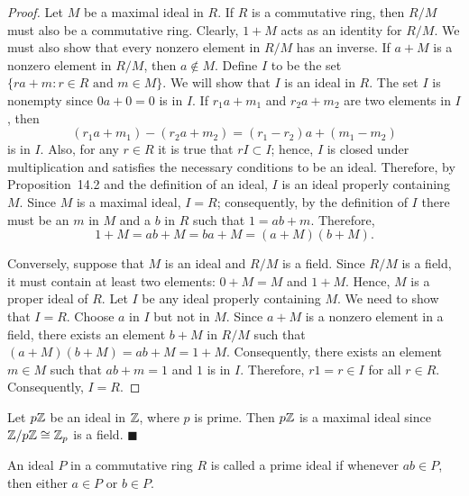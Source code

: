  
\begin{proof}
Let $M$ be a maximal ideal in $R$. If $R$ is a commutative ring, then
$R/M$ must also be a commutative ring.  Clearly, $1 + M$ acts as an
identity for $R/M$. We must also show that every nonzero element in
$R/M$ has an inverse.  If $a+M$ is a nonzero element in $R/M$, then $a
\notin M$. Define $I$ to be the set $\{ ra +m : r \in R \mbox{ and } m
\in M \}$. We will show that $I$ is an ideal in $R$. The set $I$ is
nonempty since $0a+0=0$ is in $I$. If $r_1 a +m_1$ and $r_2 a +m_2$
are two elements in $I$, then 
\[
(r_1 a + m_1) - ( r_2 a +m_2) = (r_1 - r_2)a + (m_1 -m_2)
\]
is in $I$. Also, for any $r \in R$ it is true that $rI \subset I$;
hence, $I$ is closed under multiplication and satisfies the
necessary conditions to be an ideal. Therefore, by Proposition~14.2
and the definition of an ideal, $I$ is an ideal properly containing
$M$. Since $M$ is a maximal ideal, $I=R$; consequently, by the
definition of $I$ there must be an $m$ in $M$ and a $b$ in $R$ such that
$1=ab+m$. Therefore, 
\[
1 + M = ab + M = ba + M = (a+M)(b+M).
\]
 
 
Conversely, suppose that $M$ is an ideal and $R/M$ is a field. Since
$R/M$ is a field, it must contain at least two elements: $0 + M = M$
and $1 + M$. Hence, $M$ is a proper ideal of $R$.  Let $I$ be any
ideal properly containing $M$. We need to show that $I = R$. Choose
$a$ in $I$ but not in $M$. Since $a+ M$ is a nonzero element in a
field, there exists an element $b +M$ in $R/M$ such that $(a+M)(b+M) =
ab + M = 1+M$.  Consequently, there exists an element $m \in M$ such
that $ab + m = 1$ and $1$ is in $I$. Therefore, $r1 =r \in I$ for all
$r \in R$. Consequently, $I = R$. 
\end{proof}
 
 
\vspace{3.5ex}
 
 
Let $p{\Bbb Z}$ be an ideal in ${\Bbb Z}$, where $p$ is prime. Then
$p{\Bbb Z}$  is a maximal ideal since ${\Bbb Z}/ p {\Bbb Z} \cong
{\Bbb Z}_p$ is a field. 
\hspace{\fill} $\blacksquare$
  
 
\vspace{3.5ex}
 
 
An ideal $P$ in a commutative ring $R$ is called a {\bfi prime
ideal\/} if whenever $ab \in P$,
then either $a \in P$ or $b \in P$.
 
 
